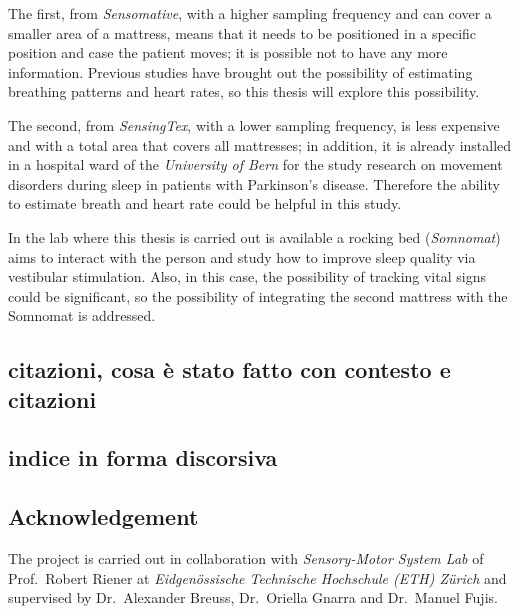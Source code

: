 The first, from \textit{Sensomative}\cite{WinNT}, with a higher sampling frequency and can cover a smaller area of a mattress, means that it needs to be positioned in a specific position and case the patient moves; it is possible not to have any more information. Previous studies have brought out the possibility of estimating breathing patterns and heart rates, so this thesis will explore this possibility.

The second, from \textit{SensingTex}\cite{sentex}, with a lower sampling frequency, is less expensive and with a total area that covers all mattresses; in addition, it is already installed in a hospital ward of the \textit{University of Bern} for the study research on movement disorders during sleep in patients with Parkinson’s disease. Therefore the ability to estimate breath and heart rate could be helpful in this study.

In the lab where this thesis is carried out is available a rocking bed (\textit{Somnomat}) aims to interact with the person and study how to improve sleep quality via vestibular stimulation. Also, in this case, the possibility of tracking vital signs could be significant, so the possibility of integrating the second mattress with the Somnomat is addressed.



\subsection*{citazioni, cosa è stato fatto con contesto e citazioni}





\subsection*{indice in forma discorsiva}

\subsection*{Acknowledgement}
The project is carried out in collaboration with \textit{Sensory-Motor System Lab} of Prof.~Robert Riener at \textit{Eidgenössische Technische Hochschule 
(ETH) Zürich} and supervised by Dr.~Alexander Breuss, Dr.~Oriella Gnarra and Dr.~Manuel Fujis.

